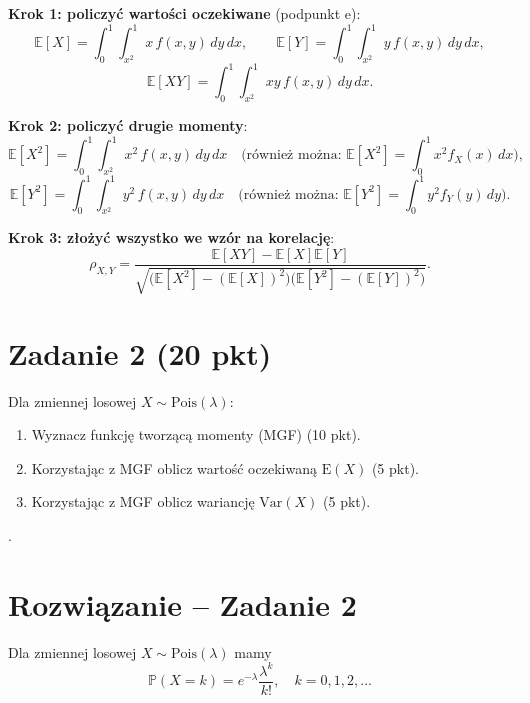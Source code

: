 \documentclass[polish, 10pt]{extarticle}
\begin{document}
\begin{enumerate}
\smallskip
\textbf{Krok 1: policzyć wartości oczekiwane} (podpunkt e):
\[
\mathbb{E}[X]=\int_{0}^{1}\int_{x^2}^{1} x\,f(x,y)\,dy\,dx,
\qquad
\mathbb{E}[Y]=\int_{0}^{1}\int_{x^2}^{1} y\,f(x,y)\,dy\,dx,
\]
\[
\mathbb{E}[XY]=\int_{0}^{1}\int_{x^2}^{1} xy\,f(x,y)\,dy\,dx.
\]

\smallskip
\textbf{Krok 2: policzyć drugie momenty}:
\[
\mathbb{E}[X^2]=\int_{0}^{1}\int_{x^2}^{1} x^2\,f(x,y)\,dy\,dx
\quad\text{(również można: } \mathbb{E}[X^2]=\int_0^1 x^2 f_X(x)\,dx\text{)},
\]
\[
\mathbb{E}[Y^2]=\int_{0}^{1}\int_{x^2}^{1} y^2\,f(x,y)\,dy\,dx
\quad\text{(również można: } \mathbb{E}[Y^2]=\int_0^1 y^2 f_Y(y)\,dy\text{)}.
\]

\smallskip
\textbf{Krok 3: złożyć wszystko we wzór na korelację}:
\[
\rho_{X,Y}
=\frac{\mathbb{E}[XY]-\mathbb{E}[X]\mathbb{E}[Y]}
{\sqrt{\big(\mathbb{E}[X^2]-(\mathbb{E}[X])^2\big)\big(\mathbb{E}[Y^2]-(\mathbb{E}[Y])^2\big)}}.
\]

\end{enumerate}

\section*{Zadanie 2 (20 pkt)}
Dla zmiennej losowej $X\sim \mathrm{Pois}(\lambda)$:
\begin{enumerate}
  \item[a)] Wyznacz funkcję tworzącą momenty (MGF) \hfill (10 pkt).
  \item[b)] Korzystając z MGF oblicz wartość oczekiwaną $\mathrm{E}(X)$ \hfill (5 pkt).
  \item[c)] Korzystając z MGF oblicz wariancję $\mathrm{Var}(X)$ \hfill (5 pkt).
\end{enumerate}. 

\section*{Rozwiązanie -- Zadanie 2}

Dla zmiennej losowej $X\sim \mathrm{Pois}(\lambda)$ mamy
\[
\mathbb{P}(X=k)=e^{-\lambda}\frac{\lambda^k}{k!},\quad k=0,1,2,\dots
\]
\end{document}
